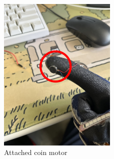 \begin{figure}[H]\centering
	\includegraphics[width=0.5\textwidth]{Pictures/coin_motor_2.png}%
	\caption{Attached coin motor}\label{fig:coin_motor_2}%
\end{figure}




